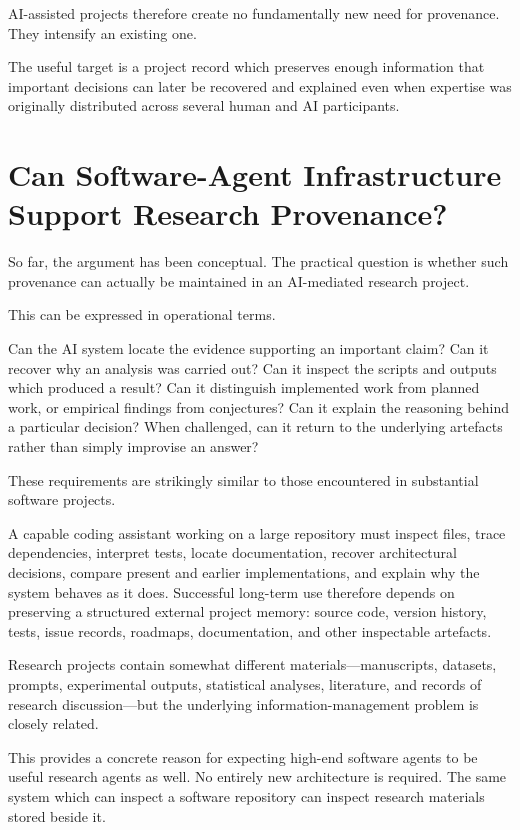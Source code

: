 AI-assisted projects therefore create no fundamentally new need for provenance. They intensify an existing one.

The useful target is a project record which preserves enough information that important decisions can later be recovered and explained even when expertise was originally distributed across several human and AI participants.


\section{Can Software-Agent Infrastructure Support Research Provenance?}

So far, the argument has been conceptual. The practical question is whether such provenance can actually be maintained in an AI-mediated research project.

This can be expressed in operational terms.

Can the AI system locate the evidence supporting an important claim? Can it recover why an analysis was carried out? Can it inspect the scripts and outputs which produced a result? Can it distinguish implemented work from planned work, or empirical findings from conjectures? Can it explain the reasoning behind a particular decision? When challenged, can it return to the underlying artefacts rather than simply improvise an answer?

These requirements are strikingly similar to those encountered in substantial software projects.

A capable coding assistant working on a large repository must inspect files, trace dependencies, interpret tests, locate documentation, recover architectural decisions, compare present and earlier implementations, and explain why the system behaves as it does. Successful long-term use therefore depends on preserving a structured external project memory: source code, version history, tests, issue records, roadmaps, documentation, and other inspectable artefacts.

Research projects contain somewhat different materials---manuscripts, datasets, prompts, experimental outputs, statistical analyses, literature, and records of research discussion---but the underlying information-management problem is closely related.

This provides a concrete reason for expecting high-end software agents to be useful research agents as well. No entirely new architecture is required. The same system which can inspect a software repository can inspect research materials stored beside it.


